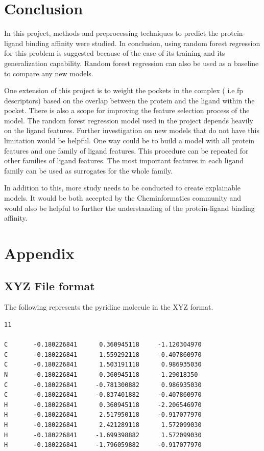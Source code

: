 \documentclass[11pt]{article}
\begin{document}
\section{Conclusion}

In this project, methods and preprocessing techniques to predict the protein-ligand binding affinity were studied.
In conclusion, using random forest regression for this problem is suggested because of the ease of its training and its generalization capability.
Random forest regression can also be used as a baseline to compare any new models.

One extension of this project is to weight the pockets in the complex ( i.e fp descriptors) based on the overlap between the protein and the ligand within the pocket.
There is also a scope for improving the feature selection process of the model.
The random forest regression model used in the project depends heavily on the ligand features.
Further investigation on new models that do not have this limitation would be helpful.
One way could be to build a model with all protein features and one family of ligand features. This procedure can be repeated for other families of ligand features.
The most important features in each ligand family can be used as surrogates for the whole family.

In addition to this, more study needs to be conducted to create explainable models.
It would be both accepted by the Cheminformatics community and would also be helpful to further the understanding of the protein-ligand binding affinity.




\section{Appendix}
\subsection{XYZ File format}
\label{XYZFileexampleref}
The following represents the pyridine molecule in the XYZ format.
\begin{verbatim}
11

C       -0.180226841      0.360945118     -1.120304970
C       -0.180226841      1.559292118     -0.407860970
C       -0.180226841      1.503191118      0.986935030
N       -0.180226841      0.360945118      1.29018350
C       -0.180226841     -0.781300882      0.986935030
C       -0.180226841     -0.837401882     -0.407860970
H       -0.180226841      0.360945118     -2.206546970
H       -0.180226841      2.517950118     -0.917077970
H       -0.180226841      2.421289118      1.572099030
H       -0.180226841     -1.699398882      1.572099030
H       -0.180226841     -1.796059882     -0.917077970
\end{verbatim}
\end{document}
